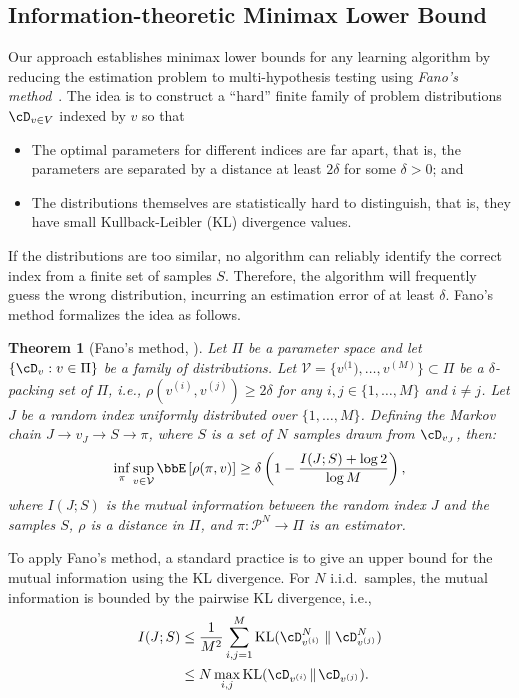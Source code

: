 \documentclass{article}
\theoremstyle{plain}
\newtheorem{theorem}{Theorem}[section]
\theoremstyle{definition}
\theoremstyle{remark}
\begin{document}
\subsection{Information-theoretic Minimax Lower Bound}
Our approach establishes minimax lower bounds for any learning algorithm by reducing the estimation problem to multi-hypothesis testing using \textit{Fano's method}~\citep{wainwright2019high}. The 
idea is to construct a ``hard'' finite family of problem distributions $\cD_{v \in V}$ indexed by $v$ so that
\begin{itemize}[leftmargin=*]
    \item The optimal parameters for different indices are far apart, that is, the parameters are separated by a distance at least $2\delta$ for some $\delta > 0$; and
    \item The distributions themselves are statistically hard to distinguish, that is, they have small Kullback-Leibler (KL) \cite{kullback1951information} divergence values.
\end{itemize}
If the distributions are too similar, no algorithm can reliably identify the correct index from a finite set of samples $S$. Therefore, the algorithm will frequently guess the wrong distribution, incurring an estimation error of at least $\delta$. Fano's method formalizes the idea as follows. 

\begin{theorem}[Fano's method, \citet{wainwright2019high}] \label{thm:fano}
    Let $\Pi$ be a parameter space and let $\{\cD_v: v \in \Pi\}$ be a family of distributions. Let $\mathcal V = \{v^{(1}), \dots, v^{(M)}\} \subset \Pi$ be a $\delta$-packing set of $\Pi$, i.e., $\rho(v^{(i)}, v^{(j)}) \geq 2\delta$ for any $i, j \in \{1, \dots, M\}$ and $i \neq j$. Let $J$ be a random index uniformly distributed over $\{1, \dots, M\}$. Defining the Markov chain $J \rightarrow v_J \rightarrow S \rightarrow \pi$, where $S$ is a set of $N$ samples drawn from $\cD_{v_J}$, then:
    \[
        \inf_{\pi} \sup_{v \in \mathcal V} \bbE\left[\rho(\pi, v)\right] \geq \delta\left(1 - \frac{I(J; S) + \log 2}{\log M}\right),
    \]
    where $I(J; S)$ is the mutual information between the random index $J$ and the samples $S$, $\rho$ is a distance in $\Pi$, and $\pi: \mathcal P^N \rightarrow \Pi$ is an estimator.
\end{theorem}

To apply Fano's method, a standard practice is to give an upper bound for the mutual information using the KL divergence. For $N$ i.i.d.~samples, the mutual information is bounded by the pairwise KL divergence, i.e.,
    \begin{align} \label{eq:information-kl-upper-bound}
        I(J; S) &\leq \frac{1}{M^2}\sum_{i, j = 1}^M\textup{KL}(\cD_{v^{(i)}}^N  \parallel  \cD_{v^{(j)}}^N)  \notag \\
        & \leq N\max_{i, j} \textup{KL}(\cD_{v^{(i)}} \!\parallel \! \cD_{v^{(j)}}).
    \end{align}
\end{document}
